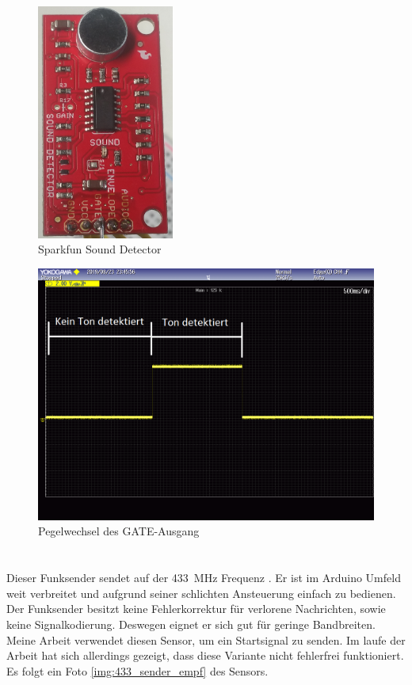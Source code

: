 \begin{figure}[H]
        \centering
        \includegraphics[width=0.4\textwidth]{images/sounddetector.png}
        \caption{Sparkfun Sound Detector}
        \label{img:sound}
\end{figure}
\begin{figure}[H]
        \centering
        \includegraphics[width=1\textwidth]{images/gate_ausgang.png}
        \caption{Pegelwechsel des \si{GATE}-Ausgang}
        \label{img:gate_ausgang}
\end{figure}

\paragraph{\funkempfaenger}\mbox{}\\
Dieser Funksender sendet auf der \SI{433}{MHz} Frequenz \cite{src_433_FUNKSENDER}. Er ist im Arduino Umfeld weit verbreitet und aufgrund seiner schlichten Ansteuerung einfach zu bedienen. Der Funksender besitzt keine Fehlerkorrektur für verlorene Nachrichten, sowie keine Signalkodierung. Deswegen eignet er sich gut für geringe Bandbreiten. Meine Arbeit verwendet diesen Sensor, um ein Startsignal zu senden. Im laufe der Arbeit hat sich allerdings gezeigt, dass diese Variante nicht fehlerfrei funktioniert. Es folgt ein Foto \ref{img:433_sender_empf} des Sensors.

